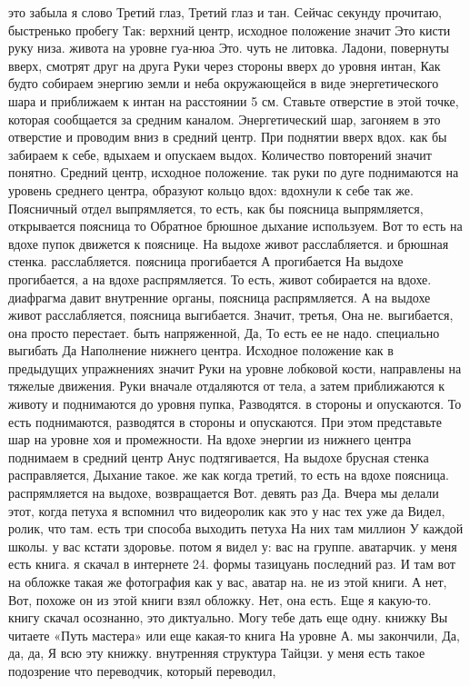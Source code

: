 это забыла я слово Третий глаз, Третий глаз и тан. Сейчас секунду прочитаю, быстренько пробегу Так: верхний центр, исходное положение значит Это кисти руку низа.
живота на уровне гуа-нюа Это.
чуть не литовка. Ладони, повернуты вверх, смотрят друг на друга Руки через стороны вверх до уровня интан, Как будто собираем энергию земли и неба окружающейся в виде энергетического шара и приближаем к интан на расстоянии 5 см. Ставьте отверстие в
этой точке, которая сообщается за средним каналом.
Энергетический шар, загоняем в это отверстие и проводим вниз в средний центр.
При поднятии вверх вдох.
как бы забираем к себе, вдыхаем и опускаем выдох.
Количество повторений значит понятно.
Средний центр, исходное положение. так руки по дуге поднимаются на уровень среднего центра, образуют кольцо вдох: вдохнули к себе так же.
Поясничный отдел выпрямляется, то есть, как бы поясница выпрямляется, открывается поясница то Обратное брюшное дыхание используем.
Вот то есть на вдохе пупок движется к пояснице.
На выдохе живот расслабляется.
и брюшная стенка.
расслабляется. поясница прогибается А прогибается На выдохе прогибается, а на вдохе распрямляется. То есть, живот собирается на вдохе. диафрагма давит внутренние органы, поясница распрямляется.
А на выдохе живот расслабляется, поясница выгибается. Значит, третья, Она не.
выгибается, она просто перестает.
быть напряженной, Да, То есть ее не надо.
специально выгибать Да Наполнение нижнего центра. Исходное положение как в предыдущих упражнениях значит Руки на уровне лобковой кости, направлены на тяжелые движения. Руки вначале отдаляются от тела, а затем приближаются к животу и поднимаются до уровня пупка, Разводятся.
в стороны и опускаются.
То есть поднимаются, разводятся в стороны и опускаются. При этом представьте шар на уровне хоя и промежности. На вдохе энергии из нижнего центра поднимаем в средний центр Анус подтягивается, На выдохе брусная стенка расправляется, Дыхание такое.
же как когда третий, то есть на вдохе поясница.
распрямляется на выдохе, возвращается Вот.
девять раз Да. Вчера мы делали этот, когда петуха я вспомнил что видеоролик как это у нас тех уже да Видел, ролик, что там.
есть три способа выходить петуха На них там миллион У каждой школы.
у вас кстати здоровье. потом я видел у:
вас на группе. аватарчик.
у меня есть книга. я скачал в интернете 24.
формы тазицуань последний раз. И там вот на обложке такая же фотография как у вас, аватар на.
не из этой книги. А нет, Вот, похоже он из этой книги взял обложку. Нет, она есть.
Еще я какую-то.
книгу скачал осознанно, это диктуально. Могу тебе дать еще одну.
книжку Вы читаете «Путь мастера» или еще какая-то книга На уровне А. мы закончили, Да, да, да, Я всю эту книжку. внутренняя структура Тайцзи. у меня есть такое подозрение что переводчик, который переводил,
